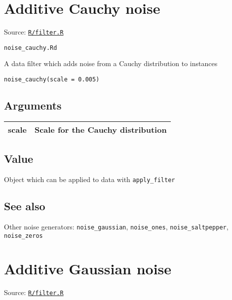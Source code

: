 \section{Additive Cauchy noise}\label{additive-cauchy-noise}

Source:
\href{https://github.com/fdavidcl/ruta/blob/master/R/filter.R}{\texttt{R/filter.R}}

\texttt{noise\_cauchy.Rd}

A data filter which adds noise from a Cauchy distribution to instances

\begin{verbatim}
noise_cauchy(scale = 0.005)
\end{verbatim}

\hypertarget{arguments}{\subsection{\texorpdfstring{\protect\hyperlink{arguments}{}Arguments}{Arguments}}\label{arguments}}

\begin{longtable}[c]{@{}ll@{}}
\toprule
scale & Scale for the Cauchy distribution\tabularnewline
\bottomrule
\end{longtable}

\hypertarget{value}{\subsection{\texorpdfstring{\protect\hyperlink{value}{}Value}{Value}}\label{value}}

Object which can be applied to data with \texttt{apply\_filter}

\hypertarget{see-also}{\subsection{\texorpdfstring{\protect\hyperlink{see-also}{}See
also}{See also}}\label{see-also}}

Other noise generators: \texttt{noise\_gaussian}, \texttt{noise\_ones},
\texttt{noise\_saltpepper}, \texttt{noise\_zeros}

\section{Additive Gaussian noise}\label{additive-gaussian-noise}

Source:
\href{https://github.com/fdavidcl/ruta/blob/master/R/filter.R}{\texttt{R/filter.R}}

